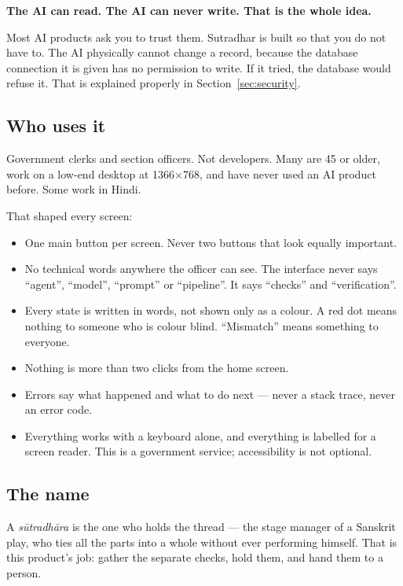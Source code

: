 \documentclass[11pt,a4paper]{article}
\newcommand{\keyline}[1]{%
  \par\vspace{4pt}%
  \noindent\colorbox{shade}{\parbox{\dimexpr\linewidth-2\fboxsep}{\textbf{#1}}}%
  \par\vspace{6pt}%
}
\begin{document}
\keyline{The AI can read. The AI can never write. That is the whole idea.}

Most AI products ask you to trust them. Sutradhar is built so that you do not
have to. The AI physically cannot change a record, because the database
connection it is given has no permission to write. If it tried, the database
would refuse it. That is explained properly in Section~\ref{sec:security}.

\subsection{Who uses it}

Government clerks and section officers. Not developers. Many are 45 or older,
work on a low-end desktop at 1366$\times$768, and have never used an AI product
before. Some work in Hindi.

That shaped every screen:

\begin{itemize}
  \item One main button per screen. Never two buttons that look equally important.
  \item No technical words anywhere the officer can see. The interface never says
        ``agent'', ``model'', ``prompt'' or ``pipeline''. It says ``checks'' and
        ``verification''.
  \item Every state is written in words, not shown only as a colour. A red dot
        means nothing to someone who is colour blind. ``Mismatch'' means
        something to everyone.
  \item Nothing is more than two clicks from the home screen.
  \item Errors say what happened and what to do next --- never a stack trace,
        never an error code.
  \item Everything works with a keyboard alone, and everything is labelled for a
        screen reader. This is a government service; accessibility is not
        optional.
\end{itemize}

\subsection{The name}

A \emph{s\=utradh\=ara} is the one who holds the thread --- the stage manager of
a Sanskrit play, who ties all the parts into a whole without ever performing
himself. That is this product's job: gather the separate checks, hold them,
and hand them to a person.
\end{document}
